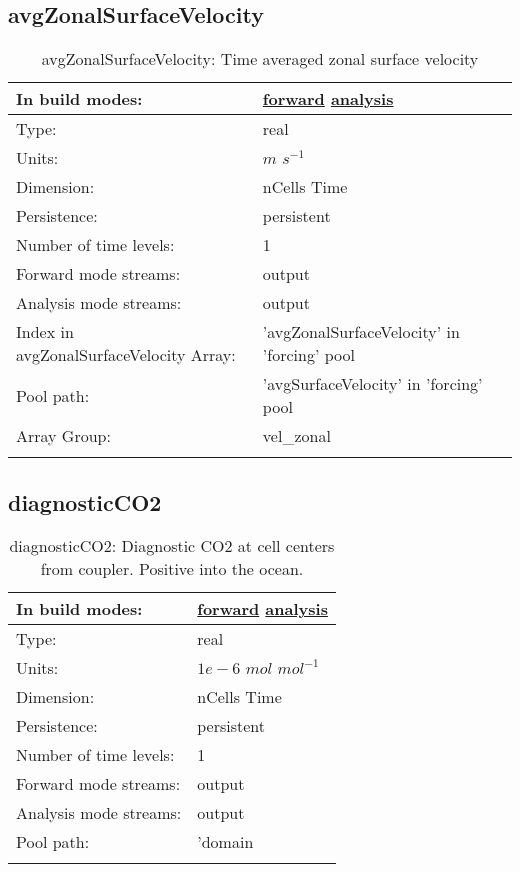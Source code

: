 \subsection[avgZonalSurfaceVelocity]{avgZonalSurfaceVelocity}
\label{subsec:var_sec_forcing_avgZonalSurfaceVelocity}
\begin{center}
\begin{longtable}{| p{2.0in} | p{4.0in} |}
        \hline 
        In build modes: & \hyperref[subsec:forward_var_tab_forcing]{forward} \hyperref[subsec:analysis_var_tab_forcing]{analysis} \\
        \hline 
        Type: & real \\
        \hline 
        Units: & $m$ $s^{-1}$ \\
        \hline 
        Dimension: & nCells Time \\
        \hline 
        Persistence: & persistent \\
        \hline 
        Number of time levels: & 1 \\
        \hline 
		 Forward mode streams: &  output \\
        \hline 
		 Analysis mode streams: &  output \\
        \hline 
		 Index in avgZonalSurfaceVelocity Array: & 'avgZonalSurfaceVelocity' in 'forcing' pool \\
		 \hline 
            Pool path: & 'avgSurfaceVelocity' in 'forcing' pool
 \\
		 \hline 
		 Array Group: & vel\_zonal \\
		 \hline 
    \caption{avgZonalSurfaceVelocity: Time averaged zonal surface velocity}
\end{longtable}
\end{center}
\subsection[diagnosticCO2]{diagnosticCO2}
\label{subsec:var_sec_forcing_diagnosticCO2}
\begin{center}
\begin{longtable}{| p{2.0in} | p{4.0in} |}
        \hline 
        In build modes: & \hyperref[subsec:forward_var_tab_forcing]{forward} \hyperref[subsec:analysis_var_tab_forcing]{analysis} \\
        \hline 
        Type: & real \\
        \hline 
        Units: & $1e-6$ $mol$ $mol^{-1}$ \\
        \hline 
        Dimension: & nCells Time \\
        \hline 
        Persistence: & persistent \\
        \hline 
        Number of time levels: & 1 \\
        \hline 
		 Forward mode streams: &  output \\
        \hline 
		 Analysis mode streams: &  output \\
        \hline 
            Pool path: & 'domain %
 \\
		 \hline 
    \caption{diagnosticCO2: Diagnostic CO2 at cell centers from coupler. Positive into the ocean.}
\end{longtable}
\end{center}
